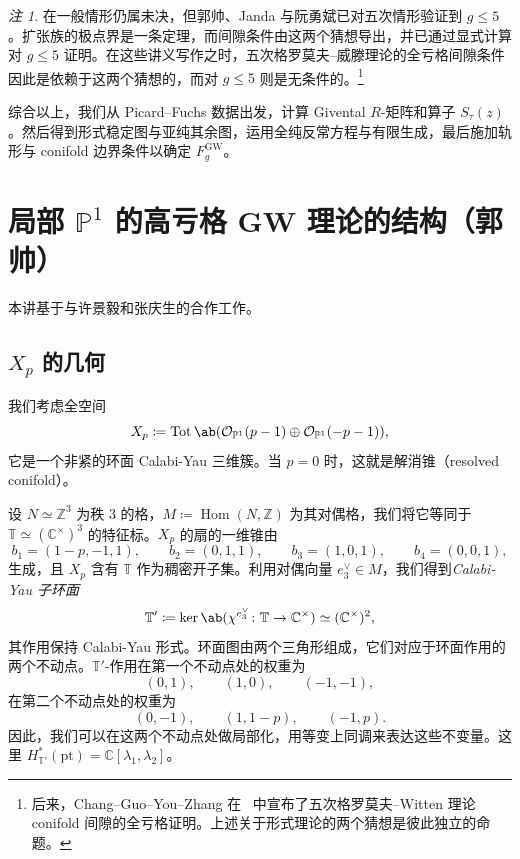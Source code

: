 \documentclass{amsart}
\theoremstyle{definition}
\theoremstyle{remark}
\newtheorem{rmk}[thm]{注}
\theoremstyle{plain}
\theoremstyle{definition}
\theoremstyle{remark}
\newcommand{\C}{\mathbb{C}}
\newcommand{\Z}{\mathbb{Z}}
\renewcommand{\P}{\mathbb{P}}
\newcommand{\mc}[1]{\mathcal{#1}}
\newcommand{\T}{\mathbb{T}}
\newcommand{\mr}[1]{\mathrm{#1}}
\newcommand{\on}[1]{\operatorname{#1}}
\newcommand{\1}{\mathbf{1}}
\newcommand{\2}{\mathbf{2}}
\newcommand{\3}{\mathbf{3}}
\DeclareMathOperator{\Hom}{Hom}
\begin{document}
\begin{rmk}
     在一般情形仍属未决，但郭帅、Janda 与阮勇斌已对五次情形验证到 \(g \leq 5\)。扩张族的极点界是一条定理，而间隙条件由这两个猜想导出，并已通过显式计算对 \(g \leq 5\) 证明。在这些讲义写作之时，五次格罗莫夫–威滕理论的全亏格间隙条件因此是依赖于这两个猜想的，而对 \(g \leq 5\) 则是无条件的。\footnote{后来，Chang--Guo--You--Zhang 在~\cite{CGYZ2026} 中宣布了五次格罗莫夫--Witten 理论 conifold 间隙的全亏格证明。上述关于形式理论的两个猜想是彼此独立的命题。}
\end{rmk}

综合以上，我们从 Picard--Fuchs 数据出发，计算 Givental \(R\)-矩阵和算子 \(S_{\tau}(z)\)。然后得到形式稳定图与亚纯其余图，运用全纯反常方程与有限生成，最后施加轨形与 conifold 边界条件以确定 \(F_g^{\mr{GW}}\)。


\section{\texorpdfstring{局部 \(\P^1\) 的高亏格 GW 理论的结构（郭帅）}{局部 P1 的高亏格 GW 理论的结构（郭帅）}}%
\label{sec:Structure of higher-genus GW theory of local P1 (Shuai Guo)}

本讲基于与许景毅和张庆生的合作工作。

\subsection{\(X_p\) 的几何}%
\label{sub:The geometry of Xp}

我们考虑全空间
\[ X_p \coloneqq \on{Tot}\ab(\mc{O}_{\P^1}(p-1) \oplus \mc{O}_{\P^1}(-p-1)), \]
它是一个非紧的环面 Calabi-Yau 三维簇。当 \(p = 0\) 时，这就是解消锥（resolved conifold）。

设 \(N \simeq \Z^3\) 为秩 \(3\) 的格，\(M \coloneqq \Hom(N,\Z)\) 为其对偶格，我们将它等同于 \(\T \simeq (\C^{\times})^3\) 的特征标。\(X_p\) 的扇的一维锥由
\[ b_1 = (1-p,-1,1), \qquad b_2 = (0,1,1), \qquad b_3 = (1,0,1), \qquad b_4 = (0,0,1), \]
生成，且 \(X_p\) 含有 \(\T\) 作为稠密开子集。利用对偶向量 \(e_3^{\vee} \in M\)，我们得到\textit{Calabi-Yau 子环面}
\[ \T' \coloneqq \ker\ab(\chi^{e_3^{\vee}} \colon \T \to \C^{\times}) \simeq (\C^{\times})^2, \]
其作用保持 Calabi-Yau 形式。环面图由两个三角形组成，它们对应于环面作用的两个不动点。\(\T'\)-作用在第一个不动点处的权重为
\[ (0,1), \qquad (1,0), \qquad (-1,-1), \]
在第二个不动点处的权重为
\[ (0,-1), \qquad (1,1-p), \qquad (-1,p). \]
因此，我们可以在这两个不动点处做局部化，用等变上同调来表达这些不变量。这里 \(H^*_{\T'}(\mr{pt}) = \C[\lambda_1,\lambda_2]\)。
\end{document}

